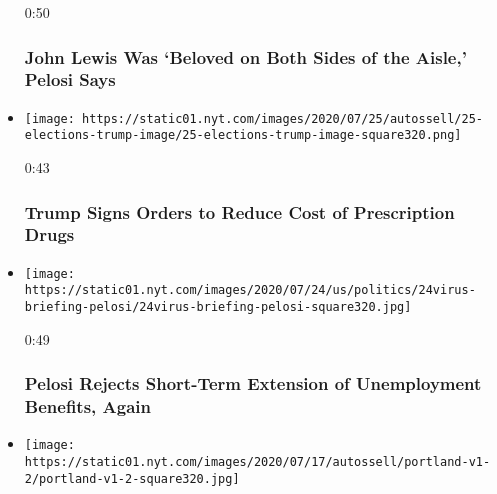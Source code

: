 \begin{itemize}
  0:50

  \hypertarget{john-lewis-was-beloved-on-both-sides-of-the-aisle-pelosi-says}{%
  \subsubsection{John Lewis Was `Beloved on Both Sides of the Aisle,'
  Pelosi
  Says}\label{john-lewis-was-beloved-on-both-sides-of-the-aisle-pelosi-says}}
\item
  \href{https://www.nytimes.com/video/us/100000007255909/trump-executive-order-prescription-drugs.html?action=click\&module=video-series-bar\&region=header\&pgtype=Article\&playlistId=video/us-politics}{}

  \texttt{[image: https://static01.nyt.com/images/2020/07/25/autossell/25-elections-trump-image/25-elections-trump-image-square320.png]}

  0:43

  \hypertarget{trump-signs-orders-to-reduce-cost-of-prescription-drugs}{%
  \subsubsection{Trump Signs Orders to Reduce Cost of Prescription
  Drugs}\label{trump-signs-orders-to-reduce-cost-of-prescription-drugs}}
\item
  \href{https://www.nytimes.com/video/us/100000007256158/pelosi-rejects-unemployment-extension.html?action=click\&module=video-series-bar\&region=header\&pgtype=Article\&playlistId=video/us-politics}{}

  \texttt{[image: https://static01.nyt.com/images/2020/07/24/us/politics/24virus-briefing-pelosi/24virus-briefing-pelosi-square320.jpg]}

  0:49

  \hypertarget{pelosi-rejects-short-term-extension-of-unemployment-benefits-again}{%
  \subsubsection{Pelosi Rejects Short-Term Extension of Unemployment
  Benefits,
  Again}\label{pelosi-rejects-short-term-extension-of-unemployment-benefits-again}}
\item
  \href{https://www.nytimes.com/video/us/100000007243995/portland-protests-federal-government.html?action=click\&module=video-series-bar\&region=header\&pgtype=Article\&playlistId=video/us-politics}{}

  \texttt{[image: https://static01.nyt.com/images/2020/07/17/autossell/portland-v1-2/portland-v1-2-square320.jpg]}


\end{itemize}
